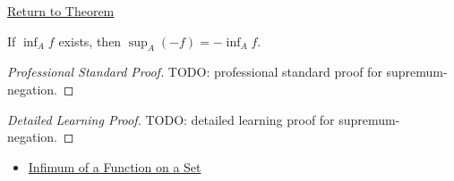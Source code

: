 \newpage
{}
\label{prf:supremum-negation}

\begin{remark*}[Return]
\hyperref[thm:supremum-negation]{Return to Theorem}
\end{remark*}

\begin{theorem*}
If \(\inf_A f\) exists, then \(\sup_A(-f)=-\inf_A f\).
\end{theorem*}

\begin{proof}[Professional Standard Proof]
\LRAProofBodyStart
TODO: professional standard proof for supremum-negation.
\end{proof}

\begin{proof}[Detailed Learning Proof]
\LRAProofBodyStart
TODO: detailed learning proof for supremum-negation.
\end{proof}

\begin{remark*}
\end{remark*}

\begin{dependencies}
\begin{itemize}
  \item \hyperref[def:function-infimum-on-set]{Infimum of a Function on a Set}
\end{itemize}
\end{dependencies}

\clearpage
